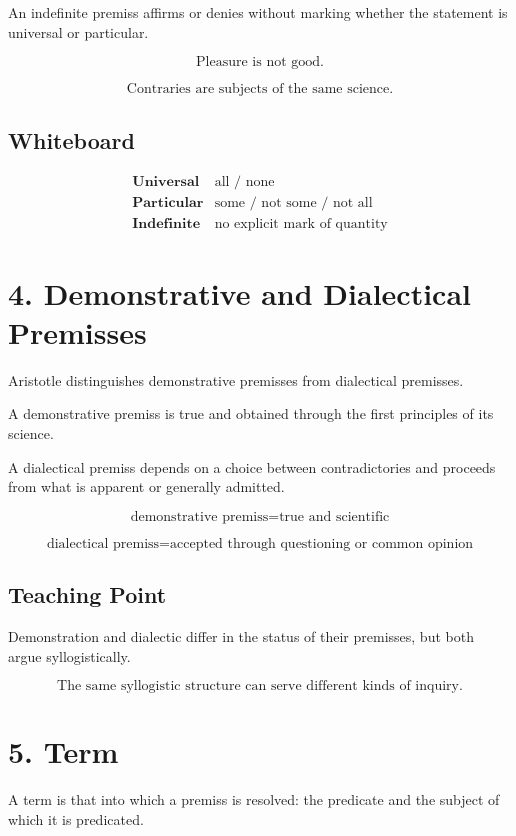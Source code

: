 \documentclass[12pt]{article}
\begin{document}
An indefinite premiss affirms or denies without marking whether the statement
is universal or particular.

\[
\text{Pleasure is not good.}
\]

\[
\text{Contraries are subjects of the same science.}
\]

\subsection*{Whiteboard}

\[
\begin{array}{ll}
\textbf{Universal} & \text{all / none} \\
\textbf{Particular} & \text{some / not some / not all} \\
\textbf{Indefinite} & \text{no explicit mark of quantity}
\end{array}
\]

\section*{4. Demonstrative and Dialectical Premisses}

Aristotle distinguishes demonstrative premisses from dialectical premisses.

A demonstrative premiss is true and obtained through the first principles of
its science.

A dialectical premiss depends on a choice between contradictories and proceeds
from what is apparent or generally admitted.

\[
\text{demonstrative premiss} = \text{true and scientific}
\]

\[
\text{dialectical premiss} = \text{accepted through questioning or common opinion}
\]

\subsection*{Teaching Point}

Demonstration and dialectic differ in the status of their premisses, but both
argue syllogistically.

\[
\boxed{
\text{The same syllogistic structure can serve different kinds of inquiry.}
}
\]

\section*{5. Term}

A term is that into which a premiss is resolved: the predicate and the subject
of which it is predicated.
\end{document}
